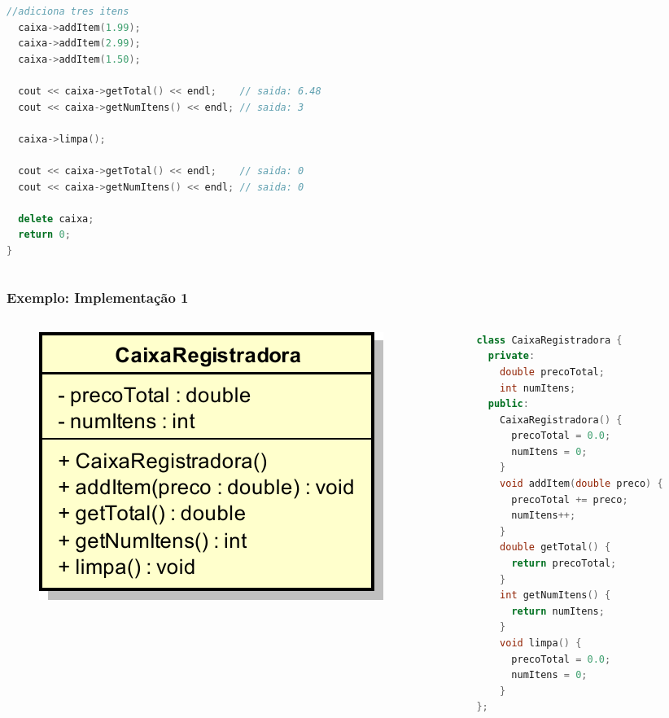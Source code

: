 \documentclass[aspectratio=169]{beamer}
\begin{document}
\begin{frame}[fragile]
\begin{columns}
\begin{column}{0.55\linewidth}
\begin{itemize}
\begin{lstlisting}[language=C++,basicstyle=\ttfamily\tiny]
  //adiciona tres itens
  caixa->addItem(1.99);
  caixa->addItem(2.99);
  caixa->addItem(1.50);

  cout << caixa->getTotal() << endl;    // saida: 6.48
  cout << caixa->getNumItens() << endl; // saida: 3

  caixa->limpa();

  cout << caixa->getTotal() << endl;    // saida: 0
  cout << caixa->getNumItens() << endl; // saida: 0

  delete caixa;
  return 0;
}
\end{lstlisting}
\end{itemize}
\end{column}
\end{columns}
\end{frame}

\begin{frame}[fragile]\frametitle{Exemplo: Implementação 1}
\begin{columns}
\begin{column}{0.45\linewidth}
\begin{figure}[h]
	\centering
	\includegraphics[height=0.3\paperheight]{imagens/caixa_com_atributos.png}
\end{figure}
\end{column}
\begin{column}{0.55\linewidth}
\begin{lstlisting}[language=C++,basicstyle=\ttfamily\tiny]
class CaixaRegistradora {
  private:
    double precoTotal;
    int numItens;
  public:
    CaixaRegistradora() {
      precoTotal = 0.0;
      numItens = 0;
    }
    void addItem(double preco) {
      precoTotal += preco;
      numItens++;
    }
    double getTotal() {
      return precoTotal;
    }
    int getNumItens() {
      return numItens;
    }
    void limpa() {
      precoTotal = 0.0;
      numItens = 0;
    }
};
\end{lstlisting}
\end{column}
\end{columns}
\end{frame}
\end{document}
